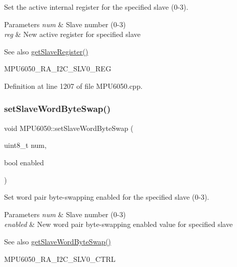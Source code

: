 Set the active internal register for the specified slave (0-\/3). 


\begin{DoxyParams}{Parameters}
{\em num} & Slave number (0-\/3) \\
\hline
{\em reg} & New active register for specified slave \\
\hline
\end{DoxyParams}
\begin{DoxySeeAlso}{See also}
\mbox{\hyperlink{classMPU6050_ae7e9ead9645bcef326eb579c6ab5d5ff}{get\+Slave\+Register()}} 

M\+P\+U6050\+\_\+\+R\+A\+\_\+\+I2\+C\+\_\+\+S\+L\+V0\+\_\+\+R\+EG 
\end{DoxySeeAlso}


Definition at line 1207 of file M\+P\+U6050.\+cpp.

\mbox{\label{classMPU6050_abeb1f83652066d7543fd3283af794364}} 
\subsubsection{\texorpdfstring{setSlaveWordByteSwap()}{setSlaveWordByteSwap()}}
{\footnotesize\ttfamily void M\+P\+U6050\+::set\+Slave\+Word\+Byte\+Swap (\begin{DoxyParamCaption}\item[{uint8\+\_\+t}]{num,  }\item[{bool}]{enabled }\end{DoxyParamCaption})}



Set word pair byte-\/swapping enabled for the specified slave (0-\/3). 


\begin{DoxyParams}{Parameters}
{\em num} & Slave number (0-\/3) \\
\hline
{\em enabled} & New word pair byte-\/swapping enabled value for specified slave \\
\hline
\end{DoxyParams}
\begin{DoxySeeAlso}{See also}
\mbox{\hyperlink{classMPU6050_a18e8f3d053a68f0e5ecf497c87ecac8a}{get\+Slave\+Word\+Byte\+Swap()}} 

M\+P\+U6050\+\_\+\+R\+A\+\_\+\+I2\+C\+\_\+\+S\+L\+V0\+\_\+\+C\+T\+RL 
\end{DoxySeeAlso}


